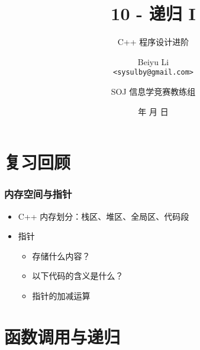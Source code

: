 \title[10 - 递归 I]
{10 - 递归 I}

\subtitle{C++ 程序设计进阶}

\author[Beiyu Li]
{Beiyu Li\\
\texttt{<sysulby@gmail.com>}}


\date[\today]
{\number\year 年 \number\month 月 \number\day 日}




\author[sysulby]
{SOJ 信息学竞赛教练组}

\begin{frame}
    \titlepage
\end{frame}
\setcounter{framenumber}{0} %


\section{复习回顾}

\begin{frame}[fragile]
    \frametitle{内存空间与指针}

    \begin{itemize}
        \item C++ 内存划分：栈区、堆区、全局区、代码段
        \item<2-> 指针
            \begin{itemize}
                \item<2-> 存储什么内容？
                \item<3-> 以下代码的含义是什么？
                
                
                \vspace{1em}

                \item<4-> 指针的加减运算
            \end{itemize}
    \end{itemize}
    
\end{frame}


\section{函数调用与递归}

